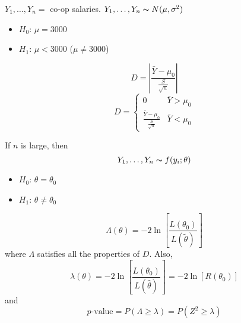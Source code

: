 \begin{exbox}
    \begin{example}
        $ Y_1,\ldots ,Y_n = $ co-op salaries. $ Y_1,\ldots ,Y_n \thicksim N(\mu,\sigma^2) $
        \begin{itemize}
            \item $ H_0 $: $ \mu=3000 $
            \item $ H_1 $: $ \mu<3000 $ ($ \mu\neq 3000 $)
        \end{itemize}
        \[ D=\left|\frac{\bar{Y}-\mu_0}{\frac{S}{\sqrt{n}}} \right| \]
        \[ D=
            \begin{cases}
                0                                        & \bar{Y}>\mu_0 \\
                \frac{\bar{Y}-\mu_0}{\frac{S}{\sqrt{n}}} & \bar{Y}<\mu_0
            \end{cases} \]
    \end{example}
\end{exbox}
If $ n $ is large, then
\[ Y_1,\ldots ,Y_n \thicksim f(y_i;\theta) \]
\begin{itemize}
    \item $ H_0 $: $ \theta=\theta_0 $
    \item $ H_1 $: $ \theta\neq \theta_0 $
\end{itemize}
\[ \Lambda(\theta)=-2\ln\left[ \frac{L(\theta_0)}{L(\tilde{\theta})} \right] \]
where $ \Lambda $ satisfies all the properties of $ D $. Also,
\[ \lambda(\theta)=-2\ln\left[ \frac{L(\theta_0)}{L(\hat{\theta})}\right]
    =-2\ln\left[ R(\theta_0) \right] \]
and
\[ p\text{-value}=P(\Lambda\geqslant \lambda)=P(Z^2\geqslant \lambda) \]
